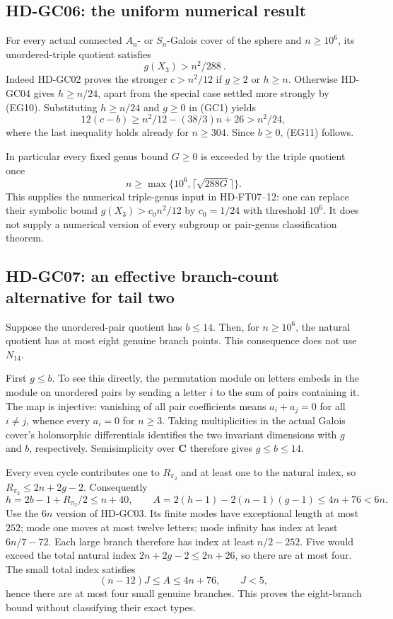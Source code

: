 \subsection*{HD-GC06: the uniform numerical result}

For every actual connected $A_n$- or $S_n$-Galois cover of the
sphere and $n\geq10^6$, its unordered-triple quotient satisfies
\[
                         \boxed{\ g(X_3)>n^2/288\ }. \tag{EG11}
\]
Indeed HD-GC02 proves the stronger $c>n^2/12$ if $g\geq2$ or
$h\geq n$. Otherwise HD-GC04 gives $h\geq n/24$, apart from
the special case settled more strongly by (EG10). Substituting
$h\geq n/24$ and $g\geq0$ in (GC1) yields
\[
 12(c-b)\geq n^2/12-(38/3)n+26>n^2/24,
\]
where the last inequality holds already for $n\geq304$.
Since $b\geq0$, (EG11) follows.

In particular every fixed genus bound $G\geq0$ is exceeded by
the triple quotient once
\[
                 n\geq\max\{10^6,\lceil\sqrt{288G}\rceil\}.
\]
This supplies the numerical triple-genus input in HD-FT07--12:
one can replace their symbolic bound $g(X_3)>c_0n^2/12$ by
$c_0=1/24$ with threshold $10^6$. It does not supply a numerical
version of every subgroup or pair-genus classification theorem.

\subsection*{HD-GC07: an effective branch-count alternative for tail two}

Suppose the unordered-pair quotient has $b\leq14$. Then, for
$n\geq10^6$, the natural quotient has at most eight genuine
branch points. This consequence does not use $N_{14}$.

First $g\leq b$. To see this directly, the permutation module on
letters embeds in the module on unordered pairs by sending a
letter $i$ to the sum of pairs containing it. The map is injective:
vanishing of all pair coefficients means $a_i+a_j=0$ for all
$i\ne j$, whence every $a_i=0$ for $n\geq3$.
Taking multiplicities in the actual Galois cover's holomorphic
differentials identifies the two invariant dimensions with $g$
and $b$, respectively. Semisimplicity over $\mathbf C$ therefore
gives $g\leq b\leq14$.

Every even cycle contributes one to $R_{\pi_2}$ and at least one
to the natural index, so $R_{\pi_2}\leq2n+2g-2$. Consequently
\[
 h=2b-1+R_{\pi_2}/2\leq n+40,\qquad
 A=2(h-1)-2(n-1)(g-1)\leq4n+76<6n.
\]
Use the $6n$ version of HD-GC03. Its finite modes have exceptional
length at most $252$; mode one moves at most twelve letters;
mode infinity has index at least $6n/7-72$. Each large branch
therefore has index at least $n/2-252$. Five would exceed the
total natural index $2n+2g-2\leq2n+26$, so there are at most four.
The small total index satisfies
\[
                (n-12)J\leq A\leq4n+76,
                \qquad J<5,
\]
hence there are at most four small genuine branches. This proves
the eight-branch bound without classifying their exact types.

